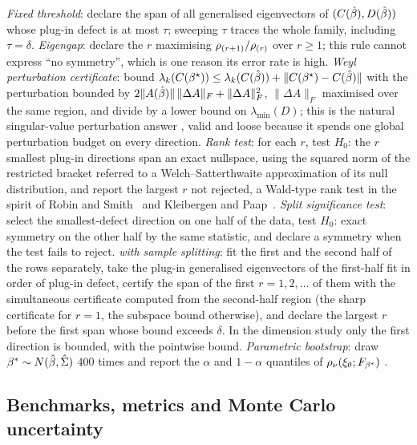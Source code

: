 \emph{Fixed threshold}: declare the span of all generalised eigenvectors of
$(C(\hat{\beta}), D(\hat{\beta}))$ whose plug-in defect is at most $\tau$; sweeping $\tau$
traces the whole family, including $\tau = \delta$. \emph{Eigengap}: declare
the $r$ maximising $\rho_{(r+1)}/\rho_{(r)}$ over $r \ge 1$; this rule
cannot express ``no symmetry'', which is one reason its error rate is high.
\emph{Weyl perturbation certificate}: bound $\lambda_k(C(\beta^\star)) \le
\lambda_k(C(\hat{\beta})) + \|C(\beta^\star)-C(\hat{\beta})\|$ with the perturbation
bounded by $2\|A(\hat{\beta})\|\,\|\Delta A\|_F + \|\Delta A\|_F^2$, $\|\Delta A\|_F$
maximised over the same region, and divide by a lower bound on
$\lambda_{\min}(D)$; this is the natural singular-value perturbation answer
\citep{bhatia1997matrix,davis1970rotation,yu2015useful}, valid
and loose because it spends one global perturbation budget on every direction.
\emph{Rank test}: for each $r$, test $H_0$: the $r$ smallest plug-in directions
span an exact nullspace, using the squared norm of the restricted bracket
referred to a Welch--Satterthwaite approximation of its null distribution, and
report the largest $r$ not rejected, a Wald-type rank test in the spirit of
Robin and Smith~\citep{robin2000tests} and Kleibergen and Paap~\citep{kleibergen2006generalized}. \emph{Split
significance test}: select the smallest-defect direction on one half of the
data, test $H_0$: exact symmetry on the other half by the same statistic, and
declare a symmetry when the test fails to reject. \emph{\symcert{} with sample
splitting}: fit the first and the second half of the rows separately, take the
plug-in generalised eigenvectors of the first-half fit in order of plug-in
defect, certify the span of the first $r = 1, 2, \dots$ of them with the
simultaneous certificate computed from the second-half region (the sharp
certificate for $r = 1$, the subspace bound otherwise), and declare the
largest $r$ before the first span whose bound exceeds $\delta$. In the
dimension study only the first direction is bounded, with the pointwise bound.
\emph{Parametric bootstrap}: draw $\beta^* \sim N(\hat{\beta},\hat\Sigma)$ $400$
times and report the $\alpha$ and $1-\alpha$ quantiles of
$\rho_\nu(\xi_\theta;F_{\beta^*})$ \citep{efron1979bootstrap}.

\subsection{Benchmarks, metrics and Monte Carlo uncertainty}
\label{sec:benchmarks}

